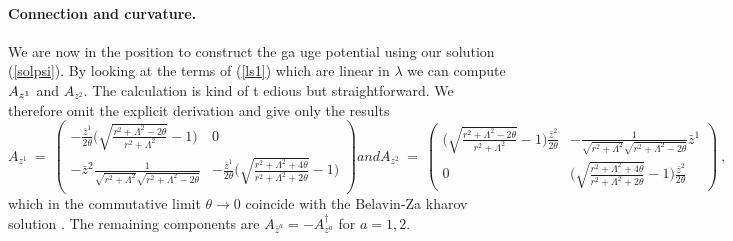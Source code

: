 \documentclass[a4paper,11pt,english]{article}
\numberwithin{equation}{section}
\renewcommand{\=}{\ =\ }
\begin{document}
\paragraph{Connection and curvature.} 
We are now in the position to construct the ga%
uge potential using our solution (\ref{solpsi}). By looking at the terms of %
(\ref{ls1}) which are linear in $\lambda$ we can compute ${A}_{z^%
1}$ and ${A}_{z^2}$. The calculation is kind of t%
edious but straightforward. We therefore omit the %
explicit derivation and give only the results
\begin{subequations}\label{gauge}
\begin{equation}
 {A}_{z^1}\=\begin{pmatrix} -\frac{\bar{z}^1}{2\theta}\biggl(\sqrt{
\frac{r^2+\Lambda^2-2\theta}{r^2+\Lambda^2}}-1\biggr) & 0\\
                   -{\scriptstyle \bar{z}^2}\frac{1}{\sqrt{r^2+\Lambda^2}%
\sqrt{r^2+\Lambda^2-2\theta}} &
                   -\frac{\bar{z}^1}{2\theta}\biggl(\sqrt{\frac{r^2+
\Lambda^2+4\theta}{r^2+\Lambda^2+2\theta}}-1\biggr) \\
                   \end{pmatrix}
\end{equation}
and
\begin{equation}
 {A}_{z^2}\=\begin{pmatrix} \biggl(\sqrt{\frac{r^2+\Lambda^2-2\theta}{
r^2+\Lambda^2}}-1\biggr)\frac{\bar{z}^2}{2\theta} &
                   -\frac{1}{\sqrt{r^2+\Lambda^2}\sqrt{r^2+\Lambda^2-2
\theta}}{\scriptstyle \bar{z}^1}\\
                   0 & \biggl(\sqrt{\frac{r^2+\Lambda^2+4\theta}{r^2+\Lambda^2
+2\theta}}-1\biggr)\frac{\bar{z}^2}{2\theta}
                   \end{pmatrix}\ ,
\end{equation}
\end{subequations}
which in the commutative limit $\theta\to 0$ coincide with the Belavin-Za%
kharov solution \cite{Belavin:cz}. 
The remaining components are ${A}_{\bar{z}^a}=-{A}^\dagger_{z^a}$ for $a=1,2$.
\end{document}
